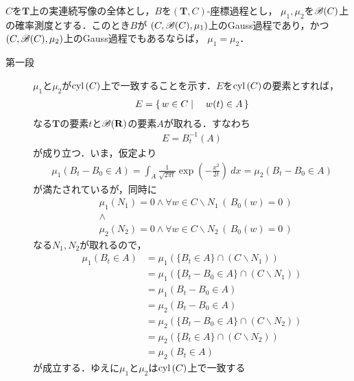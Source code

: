 	\begin{screen}
		\begin{dfn}[座標過程をGauss過程とする確率測度の一意性]\label{thm:uniqueness_of_gauss_measure}
			$C$を$\mathbf{T}$上の実連続写像の全体とし，$B$を$(\mathbf{T},C)$-座標過程とし，
			$\mu_1,\mu_2$を$\mathscr{B}(C)$上の確率測度とする．このとき$B$が
			$(C,\mathscr{B}(C),\mu_1)$上のGauss過程であり，かつ
			$(C,\mathscr{B}(C),\mu_2)$上のGauss過程でもあるならば，
			$\mu_1 = \mu_2$．
		\end{dfn}
	\end{screen}
	
	\begin{prf}\mbox{}
		\begin{description}
			\item[第一段]
				$\mu_1$と$\mu_2$が$\operatorname{cyl}\left(C\right)$上で一致することを示す．$E$を$\operatorname{cyl}\left(C\right)$の要素とすれば，
				\begin{align}
					E = \left\{\, w \in C \mid \quad w(t) \in A\, \right\}
				\end{align}
				なる$\mathbf{T}$の要素$t$と$\mathscr{B}(\mathbf{R})$の要素$A$が取れる．すなわち
				\begin{align}
					E = B_t^{-1}(A)
				\end{align}
				が成り立つ．いま，仮定より
				\begin{align}
					\mu_1(B_t - B_0 \in A) = \int_A \frac{1}{\sqrt{2\pi t}} \exp\left(-\frac{x^2}{2t}\right)\ dx
					= \mu_2(B_t - B_0 \in A)
				\end{align}
				が満たされているが，同時に
				\begin{align}
					&\mu_1(N_1) = 0 \wedge \forall w \in C \backslash N_1\, \left(\, B_0(w) = 0\, \right) \\
					&\wedge \\
					&\mu_2(N_2) = 0 \wedge \forall w \in C \backslash N_2\, \left(\, B_0(w) = 0\, \right)
				\end{align}
				なる$N_1,N_2$が取れるので，
				\begin{align}
					\mu_1(B_t \in A) &= \mu_1\left(\{B_t \in A\} \cap (C \backslash N_1)\right) \\
					&= \mu_1\left(\{B_t - B_0 \in A\} \cap (C \backslash N_1)\right) \\
					&= \mu_1(B_t - B_0 \in A) \\
					&= \mu_2(B_t - B_0 \in A) \\
					&= \mu_2\left(\{B_t - B_0 \in A\} \cap (C \backslash N_2)\right) \\
					&= \mu_2\left(\{B_t \in A\} \cap (C \backslash N_2)\right) \\
					&= \mu_2(B_t \in A)
				\end{align}
				が成立する．ゆえに$\mu_1$と$\mu_2$は$\operatorname{cyl}\left(C\right)$上で一致する
				

\end{description}
\end{prf}
